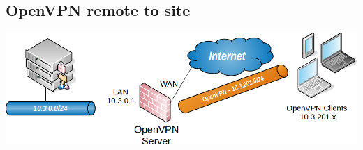 \documentclass[a4paper]{article}
\begin{document}
\subsection{OpenVPN remote to site}





\begin{center} \includegraphics[width=0.99\linewidth]{images/openvpn-02.png} \end{center}
\end{document}
